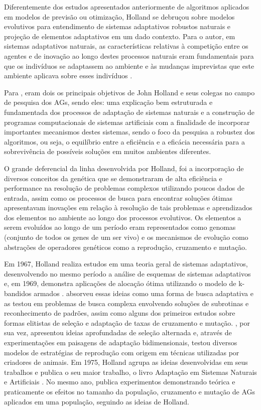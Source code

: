 Diferentemente dos estudos apresentados anteriormente de algoritmos aplicados em modelos de previsão ou otimização, Holland se debruçou sobre modelos evolutivos para entendimento de sistemas adaptativos robustos naturais e projeção de elementos adaptativos em um dado contexto. Para o autor, em sistemas adaptativos naturais, as características relativas à competição entre os agentes e de inovação ao longo destes processos naturais eram fundamentais para que os indivíduos se adaptassem ao ambiente e às mudanças imprevistas que este ambiente aplicava sobre esses indivíduos .

Para \cite[p. 1]{goldberg_genetic_1989}, eram dois os principais objetivos de John Holland e seus colegas no campo de pesquisa dos AGs, sendo eles: uma explicação bem estruturada e fundamentada dos processos de adaptação de sistemas naturais e a construção de programas computacionais de sistemas artificiais com a finalidade de incorporar importantes mecanismos destes sistemas, sendo o foco da pesquisa a robustez dos algoritmos, ou seja, o equilíbrio entre a eficiência e a eficácia necessária para a sobrevivência de possíveis soluções em muitos ambientes diferentes.

O grande deferencial da linha desenvolvida por Holland, foi a incorporação de diversos conceitos da genética que se demonstraram de alta eficiência e performance na resolução de problemas complexos utilizando poucos dados de entrada, assim como os processos de busca para encontrar soluções ótimas apresentavam inovações em relação à resolução de tais problemas e aprendizados dos elementos no ambiente ao longo dos processos evolutivos. Os elementos a serem evoluídos ao longo de um período eram representados como genomas (conjunto de todos os genes de um ser vivo) e os mecanismos de evolução como abstrações de operadores genéticos como a reprodução, cruzamento e mutação.

Em 1967, Holland realiza estudos em uma teoria geral de sistemas adaptativos, desenvolvendo no mesmo período a análise de esquemas de sistemas adaptativos e, em 1969, demonstra aplicações de alocação ótima utilizando o modelo de k-bandidos armados . \cite{cavicchio_adaptive_1970} absorveu essas ideias como uma forma de busca adaptativa e as testou em problemas de busca complexa envolvendo soluções de subrotinas e reconhecimento de padrões, assim como alguns dos primeiros estudos sobre formas elitistas de seleção e adaptação de taxas de cruzamento e mutação. \cite{university_of_michigan_artificial_1971}, por sua vez, apresentou ideias aprofundadas de seleção alternada e, através de experimentações em paisagens de adaptação bidimensionais, testou diversos modelos de estratégias de reprodução com origem em técnicas utilizadas por criadores de animais. Em 1975, Holland agrupa as ideias desenvolvidas em seus trabalhos e publica o seu maior trabalho, o livro Adaptação em Sistemas Naturais e Artificiais . No mesmo ano, \cite{jong_analysis_1975} publica experimentos demonstrando teórica e praticamente os efeitos no tamanho da população, cruzamento e mutação de AGs aplicados em uma população, seguindo as ideias de Holland.

